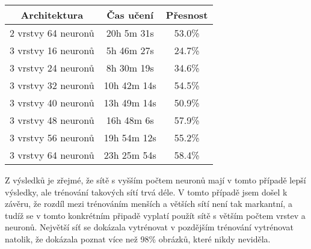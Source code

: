 \begin{center}
    \begin{tabular}{||c c c||}
        \hline
        Architektura        & Čas učení   & Přesnost \\ [0.5ex]
        \hline\hline
        2 vrstvy 64 neuronů & 20h 5m 31s  & 53.0\%   \\
        \hline
        3 vrstvy 16 neuronů & 5h 46m 27s  & 24.7\%   \\
        \hline
        3 vrstvy 24 neuronů & 8h 30m 19s  & 34.6\%   \\
        \hline
        3 vrstvy 32 neuronů & 10h 42m 14s & 54.5\%   \\
        \hline
        3 vrstvy 40 neuronů & 13h 49m 14s & 50.9\%   \\
        \hline
        3 vrstvy 48 neuronů & 16h 48m 6s  & 57.9\%   \\
        \hline
        3 vrstvy 56 neuronů & 19h 54m 12s & 55.2\%   \\
        \hline
        3 vrstvy 64 neuronů & 23h 25m 54s & 58.4\%   \\
        \hline
    \end{tabular}
\end{center}

Z výsledků je zřejmé, že sítě s vyšším počtem neuronů mají v tomto případě lepší výsledky, ale trénování takových sítí trvá déle.
V tomto případě jsem došel k závěru, že rozdíl mezi trénováním menších a větších sítí není tak markantní,
a tudíž se v tomto konkrétním připadě vyplatí použít sítě s větším počtem vrstev a neuronů.
Největší síť se dokázala vytrénovat v pozdějším trénování vytrénovat natolik, že dokázala poznat více než 98\% obrázků, které nikdy neviděla.